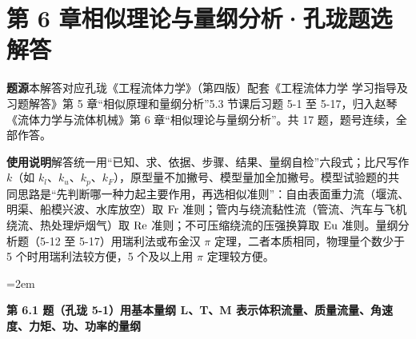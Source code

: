 \chapter*{第 6 章\quad 相似理论与量纲分析·孔珑题选 解答}

\begin{tishi}
\noindent\textbf{题源}\quad 本解答对应孔珑《工程流体力学》（第四版）配套《工程流体力学 学习指导及习题解答》第 5 章“相似原理和量纲分析”5.3 节课后习题 5-1 至 5-17，归入赵琴《流体力学与流体机械》第 6 章“相似理论与量纲分析”。共 17 题，题号连续，全部作答。

\noindent\textbf{使用说明}\quad 解答统一用“已知、求、依据、步骤、结果、量纲自检”六段式；比尺写作 $k$（如 $k_l$、$k_u$、$k_p$、$k_F$），原型量不加撇号、模型量加全加撇号。模型试验题的共同思路是“先判断哪一种力起主要作用，再选相似准则”：自由表面重力流（堰流、明渠、船模兴波、水库放空）取 $\mathrm{Fr}$ 准则；管内与绕流黏性流（管流、汽车与飞机绕流、热处理炉烟气）取 $\mathrm{Re}$ 准则；不可压缩绕流的压强换算取 $\mathrm{Eu}$ 准则。量纲分析题（5-12 至 5-17）用瑞利法或布金汉 $\pi$ 定理，二者本质相同，物理量个数少于 5 个时用瑞利法较方便，5 个及以上用 $\pi$ 定理较方便。
\end{tishi}

\sloppy\emergencystretch=2em

\noindent\textbf{第 6.1 题（孔珑 5-1）\quad 用基本量纲 L、T、M 表示体积流量、质量流量、角速度、力矩、功、功率的量纲}

